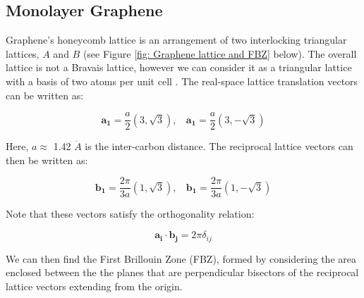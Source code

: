\documentclass[]{article}
\begin{document}
\subsection{Monolayer Graphene}
Graphene's honeycomb lattice is an arrangement of two interlocking triangular lattices, $A$ and $B$ (see Figure \ref{fig: Graphene lattice and FBZ} below). The overall lattice is not a Bravais lattice, however we can consider it as a triangular lattice with a basis of two atoms per unit cell \cite{The_Electronic_Properties_of_Graphene}. The real-space lattice translation vectors can be written as:

\begin{equation}
	\mathbf{a_1} = \frac{a}{2}(3, \sqrt{3}), \ \ \ \ \mathbf{a_1} = \frac{a}{2}(3, -\sqrt{3})
\end{equation}

Here, $a \approx$ 1.42 $\dot{A}$ is the inter-carbon distance. The reciprocal lattice vectors can then be written as:

\begin{equation}
	\mathbf{b_1} = \frac{2\pi}{3a}(1, \sqrt{3}), \ \ \ \ \mathbf{b_1} = \frac{2\pi}{3a}(1, -\sqrt{3})
\end{equation}

Note that these vectors satisfy the orthogonality relation:

\begin{equation}
	\mathbf{a_{i} \cdot b{_{j}}} = 2\pi \delta_{ij}
\end{equation}

We can then find the First Brillouin Zone (FBZ), formed by considering the area enclosed between the the planes that are perpendicular bisectors of the reciprocal lattice vectors extending from the origin. \\
\end{document}

